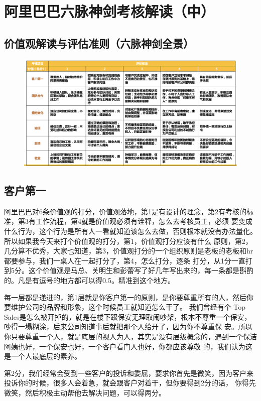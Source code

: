 \documentclass[12pt]{article}
\begin{document}
\section{阿里巴巴六脉神剑考核解读（中）}
\subsection{价值观解读与评估准则（六脉神剑全景）}
\begin{figure}[H]
    \centering
    \includegraphics[width=1\textwidth]{fig/Ali_Performance_11.png}
\end{figure}

\subsection{客户第一}
阿里巴巴对6条价值观的打分，价值观落地，第1是有设计的理念，第2有考核的标准，第3有工作流程，第4就是价值观必须有诠释，怎么去考核员工，必须 要变成什么行为，这个行为是所有人一看就知道该怎么去做，否则根本就没有办法量化。所以如果我今天来打个价值观的打分，第1，价值观打分应该有什么 原则，第2，几分算不优秀，大家也知道，第3，价值观打分的一个组织原则是老板的老板和hr都要参与，我们一桌人在一起打分了，第4，怎么打分，逐条 打分，从1分一直打到5分。这个价值观是马总、关明生和彭蕾写了好几年写出来的，每一条都是斟酌的。凡是有逗号的地方都可以得0.5。精准到这个地方。

每一层都是递进的，第1层就是你客户第一的原则，是你要尊重所有的人，然后你要维护公司的品牌和形象，这个时候员工就知道怎么干了。 我们曾经有个 Top Sales是怎么被开掉的，就是在楼下跟保安无理取闹吵架，根本不尊重一个保安，吵得一塌糊涂，后来公司知道事后就把那个人给开了，因为你不尊重保 安。所以你只要尊重一个人，就是底层的视人为人，其实是没有层级概念的，遇到一个保洁阿姨也好，一个保安也好，一个客户看门人也好，你都应该尊敬 的，我们认为这是一个人最底层的素养。

第2分，我们经常会受到一些客户的投诉和委屈，要求你首先是微笑，因为客户来投诉你的时候，很多人会着急，就会跟客户对着干，但你要得到2分的话， 你得先微笑，然后积极主动帮他去解决问题，可以得两分。
\end{document}
